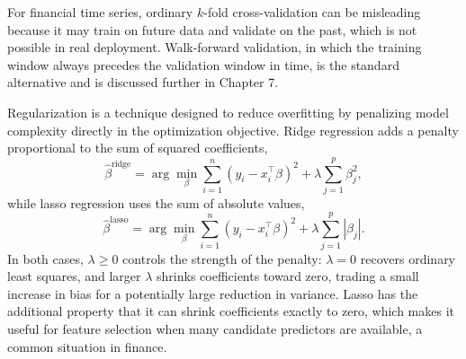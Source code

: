 \documentclass[../ai_in_finance]{subfiles}
\begin{document}
\begin{figure}[htbp]
\centering
\begin{lrbox}{\bookmeasuredbox}
\end{lrbox}
\ifdim\wd\bookmeasuredbox<0.65\linewidth
\setlength{\bookcapwidth}{0.65\linewidth}
\else
\setlength{\bookcapwidth}{\wd\bookmeasuredbox}
\fi
{}
\end{figure}

For financial time series, ordinary $k$-fold cross-validation can be misleading because it may train on future data and validate on the past, which is not possible in real deployment. Walk-forward validation, in which the training window always precedes the validation window in time, is the standard alternative and is discussed further in Chapter 7.

Regularization is a technique designed to reduce overfitting by penalizing model complexity directly in the optimization objective. Ridge regression adds a penalty proportional to the sum of squared coefficients,
\begin{equation*}
\hat\beta^{\text{ridge}} = \arg\min_\beta \sum_{i=1}^n (y_i - x_i^\top \beta)^2 + \lambda \sum_{j=1}^p \beta_j^2,
\end{equation*}
while lasso regression uses the sum of absolute values,
\begin{equation*}
\hat\beta^{\text{lasso}} = \arg\min_\beta \sum_{i=1}^n (y_i - x_i^\top \beta)^2 + \lambda \sum_{j=1}^p |\beta_j|.
\end{equation*}
In both cases, $\lambda \geq 0$ controls the strength of the penalty: $\lambda = 0$ recovers ordinary least squares, and larger $\lambda$ shrinks coefficients toward zero, trading a small increase in bias for a potentially large reduction in variance. Lasso has the additional property that it can shrink coefficients exactly to zero, which makes it useful for feature selection when many candidate predictors are available, a common situation in finance.
\end{document}
